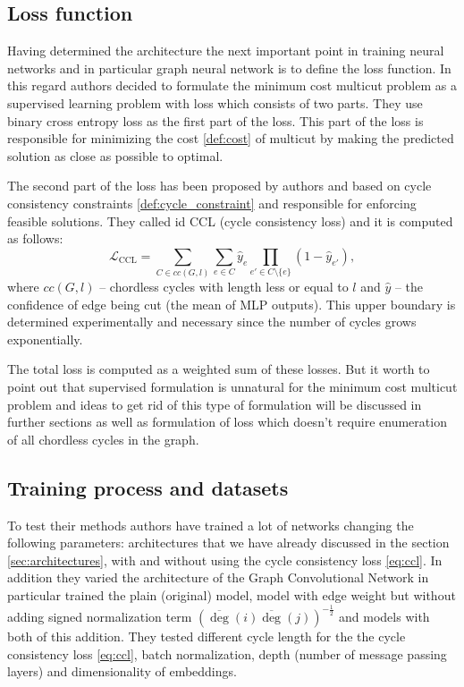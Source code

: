 \documentclass[10pt, twocolumn, a4paper]{article}
\theoremstyle{definition}
\begin{document}
\subsection{Loss function}
Having determined the architecture the next important point in training neural networks and
in particular graph neural network is to define the loss function. In this regard authors decided
to formulate the minimum cost multicut problem as a supervised learning problem with loss which consists of two parts.
They use binary cross entropy loss as the first part of the loss. This part of the loss is responsible for
minimizing the cost \eqref{def:cost} of multicut by making the predicted solution as
close as possible to optimal.

The second part of the loss has been proposed by authors and based on cycle consistency constraints \eqref{def:cycle_constraint}
and responsible for enforcing feasible solutions. They called id CCL (cycle consistency loss) and it is computed as follows:
\begin{equation} \label{eq:ccl}
    \mathcal{L}_{\text{CCL}} = \sum\limits_{C \in cc(G, l)} \sum\limits_{e \in C} \hat{y}_e
    \prod\limits_{e' \in C \setminus \{e\}} (1 - \hat{y}_{e'}),
\end{equation}
where $cc(G, l)$ -- chordless cycles with length less or equal to $l$ and $\hat{y}$ --
the confidence of edge being cut (the mean of MLP outputs). This upper boundary is determined
experimentally and necessary since the number of cycles grows exponentially.

The total loss is computed as a weighted sum of these losses. But it worth to point out that supervised
formulation is unnatural for the minimum cost multicut problem and ideas to get rid of this type of
formulation will be discussed in further sections as well as formulation of loss which doesn't require
enumeration of all chordless cycles in the graph.

\subsection{Training process and datasets}
To test their methods authors have trained a lot of networks changing the following parameters:
architectures that we have already discussed in the section \ref{sec:architectures},
with and without using the cycle consistency loss \eqref{eq:ccl}. In addition they varied the architecture
of the Graph Convolutional Network in particular trained the plain (original) model, model
with edge weight but without adding signed normalization term $\left( \overline{\deg}(i) \overline{\deg}(j) \right)^{-\frac{1}{2}}$
and models with both of this addition. They tested different cycle length for the the cycle consistency loss \eqref{eq:ccl},
batch normalization, depth (number of message passing layers) and dimensionality of embeddings.
\end{document}
